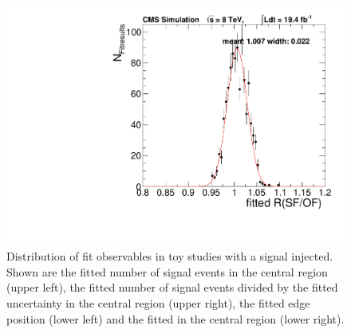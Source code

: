 \begin{figure}[hbp]
\begin{minipage}[t]{0.49\textwidth}
  \end{minipage}
  \begin{minipage}[t]{0.49\textwidth}
    \includegraphics[width=\textwidth]{plots/results/fit/rSFOF_signal120_m078.pdf}
  \end{minipage}
  \caption{Distribution of fit observables in toy studies with a signal injected. Shown are the fitted number of signal events in the central region (upper left), the fitted number of signal events divided by the fitted uncertainty in the central region (upper right), the fitted edge position (lower left) and the fitted \Rsfof in the central region (lower right).}
  \label{fig:toys:signalInjected}
\end{figure}